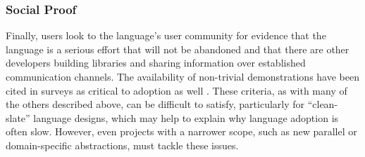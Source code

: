 \subsubsection{Social Proof}\label{social}
Finally, users look to the language's user community for evidence that the language is a serious effort that will not be abandoned and that there are other developers building libraries and sharing information over established communication channels. The availability of non-trivial demonstrations have been cited in surveys as critical to adoption as well \cite{basili2008understanding}. These criteria, as with many of the others described above, can be difficult to satisfy, particularly for ``clean-slate'' language designs, which may help to explain why language adoption is often slow. However, even projects with a narrower scope, such as new parallel or domain-specific abstractions, must tackle these issues.

% 

